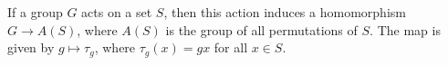 If a group $G$ acts on a set $S$, then this action induces a homomorphism $G \to A(S)$, where $A(S)$ is the group of all permutations of $S$. The map is given by $g \mapsto \tau_g$, where $\tau_g(x) = gx$ for all $x \in S$.
